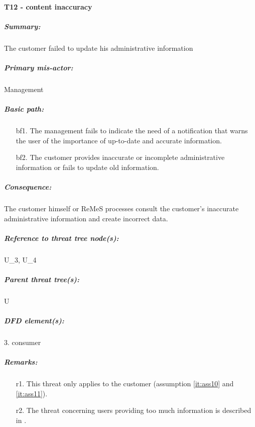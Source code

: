

\paragraph{T12 - content inaccuracy}
\label{par:t13}
    \subparagraph{Summary:} The customer failed to update his administrative information
    \subparagraph{Primary mis-actor:} Management
    \subparagraph{Basic path:} 
    \begin{enumerate}
        \item[bf1.] The management fails to indicate the need of a notification that warns the user of the
						importance of up-to-date and accurate information.
        \item[bf2.]	The customer provides inaccurate or incomplete administrative information or fails to
						update old information.
    \end{enumerate}
    \subparagraph{Consequence:} The customer himself or ReMeS processes consult the customer's inaccurate
					administrative information and create incorrect data.


    \subparagraph{Reference to threat tree node(s):} U\_3, U\_4
    \subparagraph{Parent threat tree(s):} U
    \subparagraph{DFD element(s):} 3. consumer
    \subparagraph{Remarks:}
    \begin{enumerate}
        \item[r1.] This threat only applies to the customer (assumption \ref{it:ass10} and \ref{it:ass11}).
        \item[r2.] The threat concerning users providing too much information is described in .
    \end{enumerate}



